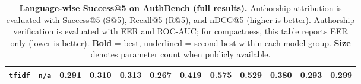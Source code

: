 \documentclass{article}
\newcommand{\rev}[1]{#1}
\begin{document}
\begin{table}[htbp]
{\begin{tabular}{lccccccccccc}
\midrule
\texttt{tfidf} & \texttt{n/a} & \textbf{0.291} & \textbf{0.310} & \textbf{0.313} & \textbf{0.267} & \textbf{0.419} & \textbf{0.575} & \textbf{0.529} & \textbf{0.380} & \textbf{0.293} & \textbf{0.299} \\
\bottomrule
\end{tabular}
}
\caption{\textbf{Language-wise Success@5 on AuthBench (full results).} Authorship attribution is evaluated with Success@5 (S@5), Recall@5 (R@5), and nDCG@5 (higher is better). \rev{Authorship verification is evaluated with EER and ROC-AUC; for compactness, this table reports EER only (lower is better).} \textbf{Bold} = best, \underline{underlined} = second best within each model group. \textbf{Size} denotes parameter count when publicly available.}
\label{tab:lang-s5-full}
\end{table}
\end{document}
